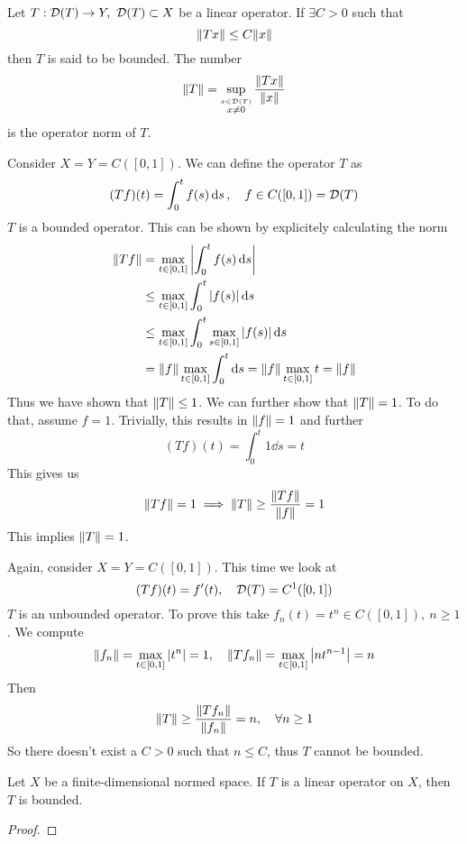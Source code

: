 \documentclass[../../script.tex]{subfiles}
\begin{document}
\begin{defi}
    Let $T: \mathcal{D}(T) \rightarrow Y, ~\mathcal{D}(T) \subset X$ be a linear operator. If $\exists C > 0$ such that 
    \[
        \norm{Tx} \le C\norm{x}
    \]
    then $T$ is said to be bounded. The number 
    \[
        \norm{T} = \sup_{\stackrel{x \in \mathcal{D}(T)}{x \ne 0}} \frac{\norm{Tx}}{\norm{x}}
    \]
    is the operator norm of $T$.
\end{defi}

\begin{eg}
    Consider $X = Y = C([0, 1])$. We can define the operator $T$ as
    \[
        (Tf)(t) = \int_0^t f(s) \dd{s}, \quad f \in C([0, 1]) = \mathcal{D}(T)
    \]
    $T$ is a bounded operator. This can be shown by explicitely calculating the norm 
    \begin{align*}
        \norm{Tf} &= \max_{t \in [0, 1]} \abs{\int_0^t f(s) \dd{s}} \\
        &\le \max_{t \in [0, 1]} \int_0^t \abs{f(s)} \dd{s} \\
        &\le \max_{t \in [0, 1]} \int_0^t \max_{s \in [0, 1]} \abs{f(s)} \dd{s} \\
        &= \norm{f} \max_{t \in [0, 1]} \int_0^t \dd{s} = \norm{f} \max_{t \in [0, 1]} t = \norm{f}
    \end{align*}
    Thus we have shown that $\norm{T} \le 1$. We can further show that $\norm{T} = 1$. To do that, assume $f = 1$. 
    Trivially, this results in $\norm{f} = 1$ and further 
    \[
        (Tf)(t) = \int_0^t 1 \dd{s} = t
    \]
    This gives us
    \[
        \norm{Tf} = 1 \implies \norm{T} \ge \frac{\norm{Tf}}{\norm{f}} = 1
    \]
    This implies $\norm{T} = 1$.
\end{eg}

\begin{eg}
    Again, consider $X = Y = C([0, 1])$. This time we look at 
    \[
        (Tf)(t) = f'(t), \quad \mathcal{D}(T) = C^1([0, 1])
    \]
    $T$ is an unbounded operator. To prove this take $f_n(t) = t^n \in C([0, 1]), ~n \ge 1$. We compute 
    \[
        \norm{f_n} = \max_{t \in [0, 1]} \abs{t^n} = 1, \quad \norm{Tf_n} = \max_{t \in [0, 1]} \abs{n t^{n-1}} = n
    \]
    Then 
    \[
        \norm{T} \ge \frac{\norm{Tf_n}}{\norm{f_n}} = n, \quad \forall n \ge 1
    \]
    So there doesn't exist a $C > 0$ such that $n \le C$, thus $T$ cannot be bounded.
\end{eg}

\begin{thm}
    Let $X$ be a finite-dimensional normed space. If $T$ is a linear operator on $X$, then $T$ is bounded.
\end{thm}
\begin{proof}
    \noproof
\end{proof}
\end{document}
